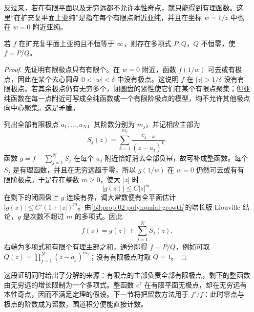 \ProseParagraphBreak

反过来，若在有限平面以及无穷远都不允许本性奇点，就只能得到有理函数。这里“在扩充复平面上亚纯”是指在每个有限点附近亚纯，并且在坐标 \(w=1/z\) 中也在 \(w=0\) 附近亚纯。
\begin{theorem}\label{b3:thm:03-sphere-rational}
若 \(f\) 在扩充复平面上亚纯且不恒等于 \(\infty\)，则存在多项式 \(P,Q\)，\(Q\) 不恒零，使 \(f=P/Q\)。
\end{theorem}
\begin{proof}
先证明有限极点只有有限个。在 \(w=0\) 附近，函数 \(f(1/w)\) 可去或有极点，因此在某个去心圆盘 \(0<|w|<\delta\) 中没有极点。这说明 \(f\) 在 \(|z|>1/\delta\) 没有有限极点。若其余极点仍有无穷多个，闭圆盘的紧性使它们在某个有限点聚集；但亚纯函数在每一点附近可写成全纯函数或一个有限阶极点的模型，均不允许其他极点向中心聚集。这是矛盾。

列出全部有限极点 \(a_1,\ldots,a_N\)，其阶数分别为 \(m_j\)，并记相应主部为
\[
 S_j(z)=\sum_{k=1}^{m_j}\frac{c_{j,-k}}{(z-a_j)^k}.
\]
函数 \(g=f-\sum_{j=1}^N S_j\) 在每个 \(a_j\) 附近恰好消去全部负幂，故可补成整函数。每个 \(S_j\) 是有理函数，并且在无穷远趋于零，所以 \(g(1/w)\) 在 \(w=0\) 仍然可去或有有限阶极点。于是存在整数 \(m\ge0\)，使大 \(|z|\) 时
\[
 |g(z)|\le C|z|^m.
\]
在剩下的闭圆盘上 \(g\) 连续有界，调大常数便有全平面估计 \(|g(z)|\le C'(1+|z|)^m\)。由\cref{b3:prop:02-polynomial-growth}的增长版 Liouville 结论，\(g\) 是次数不超过 \(m\) 的多项式。因此
\[
 f(z)=g(z)+\sum_{j=1}^N S_j(z).
\]
右端为多项式和有限个有理主部之和，通分即得 \(f=P/Q\)，例如可取 \(Q(z)=\prod_{j=1}^N(z-a_j)^{m_j}\)；没有有限极点时取 \(Q=1\)。
\end{proof}
这段证明同时给出了分解的来源：有限点的主部负责全部有限极点，剩下的整函数由无穷远的增长限制为一个多项式。整函数 \(e^z\) 在有限平面无极点，却在无穷远有本性奇点，因而不满足定理的假设。下一节将把留数方法用于 \(f'/f\)：此时零点与极点的阶数成为留数，围道积分便能直接计数。
